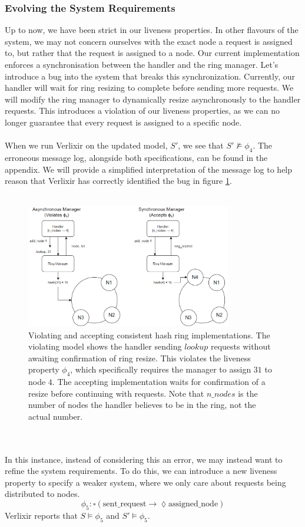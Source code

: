 \subsubsection{Evolving the System Requirements}
Up to now, we have been strict in our liveness properties. In other flavours of the system, we may not concern ourselves with the exact node a request is assigned to, but rather that the request is assigned to a node. Our current implementation enforces a synchronisation between the handler and the ring manager. Let's introduce a bug into the system that breaks this synchronization. Currently, our handler will wait for ring resizing to complete before sending more requests. We will modify the ring manager to dynamically resize asynchronously to the handler requests. This introduces a violation of our liveness properties, as we can no longer guarantee that every request is assigned to a specific node. 
\\ \\
When we run Verlixir on the updated model, $S'$, we see that $S' \not\models \phi_4$. The erroneous message log, alongside both specifications, can be found in the appendix. We will provide a simplified interpretation of the message log to help reason that Verlixir has correctly identified the bug in figure \ref{fig:dht}.
\\ \\
\begin{figure}[h]
    \centering
    \includegraphics[width=0.8\textwidth]{images/dht.png}
    \caption{Violating and accepting consistent hash ring implementations. The violating model shows the handler sending $lookup$ requests without awaiting confirmation of ring resize. This violates the liveness property $\phi_4$, which specifically requires the manager to assign $31$ to node $4$. The accepting implementation waits for confirmation of a resize before continuing with requests. Note that $n\_nodes$ is the number of nodes the handler believes to be in the ring, not the actual number.}
    \label{fig:dht}
\end{figure}
\\ \\
In this instance, instead of considering this an error, we may instead want to refine the system requirements. To do this, we can introduce a new liveness property to specify a weaker system, where we only care about requests being distributed to nodes.
\[
\phi_5: \square (\text{sent\_request} \rightarrow \lozenge \text{assigned\_node})
\]
Verlixir reports that $S \models \phi_5$ and $S' \models \phi_5$.
